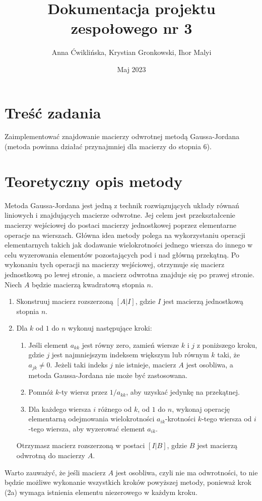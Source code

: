 \documentclass[12pt]{article}
\title{Dokumentacja projektu zespołowego nr 3}
\author{Anna Ćwiklińska, Krystian Gronkowski, Ihor Malyi}
\date{Maj 2023}
\begin{document}
\lstset{basicstyle=\ttfamily, columns=fullflexible, upquote=true}
\renewcommand{\lstlistingname}{Listing}

\maketitle
\newpage
{\hypersetup{hidelinks}
\tableofcontents
}
\newpage
\section{Treść zadania}
Zaimplementować znajdowanie macierzy odwrotnej metodą Gaussa-Jordana (metoda powinna działać przynajmniej dla macierzy do stopnia 6).

\section{Teoretyczny opis metody}
Metoda Gaussa-Jordana jest jedną z technik rozwiązujących układy równań liniowych i znajdujących macierze odwrotne. Jej celem jest przekształcenie macierzy wejściowej do postaci macierzy jednostkowej poprzez elementarne operacje na wierszach. Główna idea metody polega na wykorzystaniu operacji elementarnych takich jak dodawanie wielokrotności jednego wiersza do innego w celu wyzerowania elementów pozostających pod i nad główną przekątną. Po wykonaniu tych operacji na macierzy wejściowej, otrzymuje się macierz jednostkową po lewej stronie, a macierz odwrotna znajduje się po prawej stronie.\\

Niech $A$ będzie macierzą kwadratową stopnia $n$.
\begin{enumerate}
    \item     Skonstruuj macierz rozszerzoną $[A|I]$, gdzie $I$ jest macierzą jednostkową stopnia $n$.
\item     Dla $k$ od $1$ do $n$ wykonuj następujące kroki:
\begin{enumerate}
    \item Jeśli element $a_{kk}$ jest równy zero, zamień wiersze $k$ i $j$ z poniższego kroku, gdzie $j$ jest najmniejszym indeksem większym lub równym $k$ taki, że $a_{jk} \neq 0$. Jeżeli taki indeks $j$ nie istnieje, macierz $A$ jest osobliwa, a metoda Gaussa-Jordana nie może być zastosowana.
\item Pomnóż $k$-ty wiersz przez $1/a_{kk}$, aby uzyskać jedynkę na przekątnej.
\item Dla każdego wiersza $i$ różnego od $k$, od $1$ do $n$, wykonaj operację elementarną odejmowania wielokrotności $a_{ik}$-krotności $k$-tego wiersza od $i$-tego wiersza, aby wyzerować element $a_{ik}$.
\end{enumerate}
    Otrzymasz macierz rozszerzoną w postaci $[I|B]$, gdzie $B$ jest macierzą odwrotną do macierzy $A$.
\end{enumerate}
Warto zauważyć, że jeśli macierz $A$ jest osobliwa, czyli nie ma odwrotności, to nie będzie możliwe wykonanie wszystkich kroków powyższej metody, ponieważ krok (2a) wymaga istnienia elementu niezerowego w każdym kroku.
\end{document}
